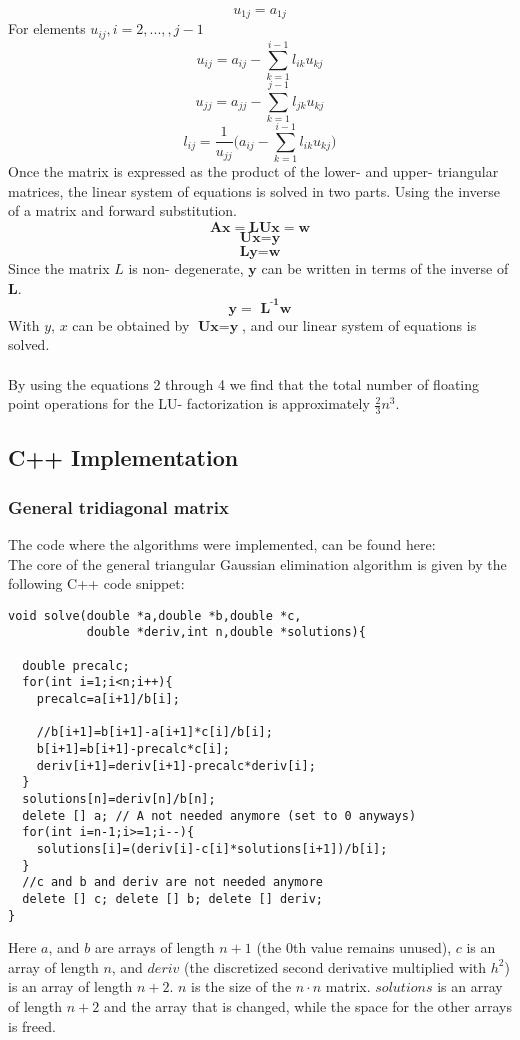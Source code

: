 \documentclass[10pt,a4paper]{article}
\begin{document}
\begin{equation}
u_{1j} = a_{1j}
\end{equation}
For elements $u_{ij}, i= 2,...,,j-1$
\begin{equation}
u_{ij} = a_{ij} - \sum_{k=1}^{i-1}l_{ik}u_{kj}
\end{equation}
\begin{equation}
u_{jj} = a_{jj} - \sum_{k=1}^{j-1}l_{jk}u_{kj}
\end{equation}
\begin{equation}
l_{ij} = \frac{1}{u_{jj}} \Bigg( a_{ij} - \sum_{k=1}^{i-1}l_{ik}u_{kj} \Bigg)
\end{equation}
Once the matrix is expressed as the product of the lower- and upper- triangular matrices, the linear system of equations is solved in two parts. Using the inverse of a matrix and forward substitution.
$$
\textbf{Ax} =\textbf{LUx} = \textbf{w}
$$
$$
\textbf{Ux} =\textbf{y}
$$
$$
\textbf{Ly} =\textbf{w}
$$
Since the matrix $L$ is non- degenerate, $\textbf{y}$ can be written in terms of the inverse of $\textbf{L}$.\\
$$
\textbf{y} =\textbf{ L}^{\textbf{-1}}\textbf{w}
$$
With $y$, $x$ can be obtained by $\textbf{Ux} =\textbf{y}$, and our linear system of equations is solved.\\\\By using the equations 2 through 4 we find that the total number of floating point operations for the LU- factorization is approximately $\frac{2}{3}n^3$.
\subsection{C++ Implementation}
\subsubsection{General tridiagonal matrix}
The code where the algorithms were implemented, can be found here: \\
The core of the general triangular Gaussian elimination algorithm is given by the following C++ code snippet:
\begin{lstlisting}[caption=Code for solving the general triangular matrix]
void solve(double *a,double *b,double *c,
		   double *deriv,int n,double *solutions){
  
  double precalc;
  for(int i=1;i<n;i++){
    precalc=a[i+1]/b[i];
    
    //b[i+1]=b[i+1]-a[i+1]*c[i]/b[i];
    b[i+1]=b[i+1]-precalc*c[i]; 
    deriv[i+1]=deriv[i+1]-precalc*deriv[i];
  }
  solutions[n]=deriv[n]/b[n];
  delete [] a; // A not needed anymore (set to 0 anyways)
  for(int i=n-1;i>=1;i--){
    solutions[i]=(deriv[i]-c[i]*solutions[i+1])/b[i];
  }
  //c and b and deriv are not needed anymore
  delete [] c; delete [] b; delete [] deriv; 
}
\end{lstlisting}
Here $a$, and $b$ are arrays of length $n+1$ (the 0th value remains unused), $c$ is an array of length $n$, and $deriv$ (the discretized second derivative multiplied with $h^2$) is an array of length $n+2$. $n$ is the size of the $ n\cdot n$ matrix. $solutions$ is an array of length $n+2$ and the array that is changed, while the space for the other arrays is freed.\\\\
\end{document}
